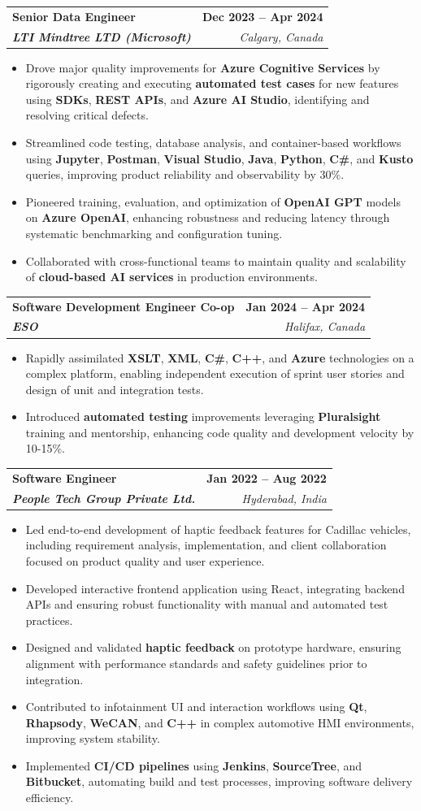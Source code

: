 \documentclass[letterpaper,11pt]{article}
\makeatletter
\newcommand{\resumeItem}[1]{
  \item\small{
    {#1 \vspace{-2pt}}
  }
}
\newcommand{\resumeSubheading}[4]{
  \vspace{-2pt}\item
    \begin{tabular*}{1.0\textwidth}[t]{l@{\extracolsep{\fill}}r}
      \textbf{#1} & \textbf{\small #2} \\
      \textit{\small#3} & \textit{\small #4} \\
    \end{tabular*}\vspace{-7pt}
}
\newcommand{\resumeItemListStart}{\begin{itemize}}
\newcommand{\resumeItemListEnd}{\end{itemize}\vspace{-5pt}}
\makeatother
\begin{document}
    \resumeSubheading
      {Senior Data Engineer}{\textbf{Dec 2023 -- Apr 2024}}
      {\textbf{LTI Mindtree LTD (Microsoft)}}{Calgary, Canada}
      \resumeItemListStart
        \resumeItem{Drove major quality improvements for \textbf{Azure Cognitive Services} by rigorously creating and executing \textbf{automated test cases} for new features using \textbf{SDKs}, \textbf{REST APIs}, and \textbf{Azure AI Studio}, identifying and resolving critical defects.}
        \resumeItem{Streamlined code testing, database analysis, and container-based workflows using \textbf{Jupyter}, \textbf{Postman}, \textbf{Visual Studio}, \textbf{Java}, \textbf{Python}, \textbf{C\#}, and \textbf{Kusto} queries, improving product reliability and observability by 30\%.}
        \resumeItem{Pioneered training, evaluation, and optimization of \textbf{OpenAI GPT} models on \textbf{Azure OpenAI}, enhancing robustness and reducing latency through systematic benchmarking and configuration tuning.}
        \resumeItem{Collaborated with cross-functional teams to maintain quality and scalability of \textbf{cloud-based AI services} in production environments.}
      \resumeItemListEnd
    
    \resumeSubheading
      {Software Development Engineer Co-op}{\textbf{Jan 2024 -- Apr 2024}}
      {\textbf{ESO}}{Halifax, Canada}
      \resumeItemListStart
        \resumeItem{Rapidly assimilated \textbf{XSLT}, \textbf{XML}, \textbf{C\#}, \textbf{C++}, and \textbf{Azure} technologies on a complex platform, enabling independent execution of sprint user stories and design of unit and integration tests.}
        \resumeItem{Introduced \textbf{automated testing} improvements leveraging \textbf{Pluralsight} training and mentorship, enhancing code quality and development velocity by 10-15\%.}
      \resumeItemListEnd

    \resumeSubheading
      {Software Engineer}{\textbf{Jan 2022 -- Aug 2022}}
      {\textbf{People Tech Group Private Ltd.}}{Hyderabad, India}
      \resumeItemListStart
        \resumeItem{Led end-to-end development of haptic feedback features for Cadillac vehicles, including requirement analysis, implementation, and client collaboration focused on product quality and user experience.}
        \resumeItem{Developed interactive frontend application using React, integrating backend APIs and ensuring robust functionality with manual and automated test practices.}
        \resumeItem{Designed and validated \textbf{haptic feedback} on prototype hardware, ensuring alignment with performance standards and safety guidelines prior to integration.}
        \resumeItem{Contributed to infotainment UI and interaction workflows using \textbf{Qt}, \textbf{Rhapsody}, \textbf{WeCAN}, and \textbf{C++} in complex automotive HMI environments, improving system stability.}
        \resumeItem{Implemented \textbf{CI/CD pipelines} using \textbf{Jenkins}, \textbf{SourceTree}, and \textbf{Bitbucket}, automating build and test processes, improving software delivery efficiency.}
      \resumeItemListEnd
\end{document}
